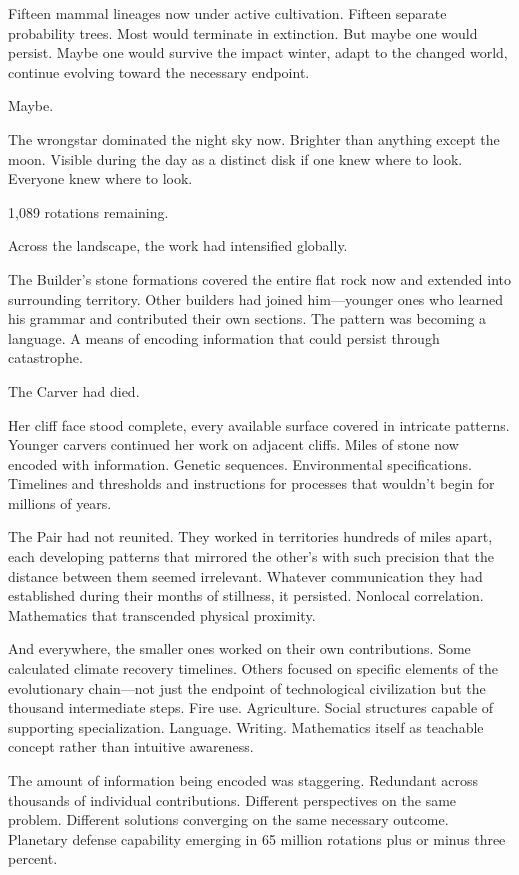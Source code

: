 Fifteen mammal lineages now under active cultivation. Fifteen separate probability trees. Most would terminate in extinction. But maybe one would persist. Maybe one would survive the impact winter, adapt to the changed world, continue evolving toward the necessary endpoint.

Maybe.

The wrongstar dominated the night sky now. Brighter than anything except the moon. Visible during the day as a distinct disk if one knew where to look. Everyone knew where to look.

1,089 rotations remaining.

\scenebreak

Across the landscape, the work had intensified globally.

The Builder's stone formations covered the entire flat rock now and extended into surrounding territory. Other builders had joined him—younger ones who learned his grammar and contributed their own sections. The pattern was becoming a language. A means of encoding information that could persist through catastrophe.

The Carver had died.

Her cliff face stood complete, every available surface covered in intricate patterns. Younger carvers continued her work on adjacent cliffs. Miles of stone now encoded with information. Genetic sequences. Environmental specifications. Timelines and thresholds and instructions for processes that wouldn't begin for millions of years.

The Pair had not reunited. They worked in territories hundreds of miles apart, each developing patterns that mirrored the other's with such precision that the distance between them seemed irrelevant. Whatever communication they had established during their months of stillness, it persisted. Nonlocal correlation. Mathematics that transcended physical proximity.

And everywhere, the smaller ones worked on their own contributions. Some calculated climate recovery timelines. Others focused on specific elements of the evolutionary chain—not just the endpoint of technological civilization but the thousand intermediate steps. Fire use. Agriculture. Social structures capable of supporting specialization. Language. Writing. Mathematics itself as teachable concept rather than intuitive awareness.

The amount of information being encoded was staggering. Redundant across thousands of individual contributions. Different perspectives on the same problem. Different solutions converging on the same necessary outcome. Planetary defense capability emerging in 65 million rotations plus or minus three percent.

